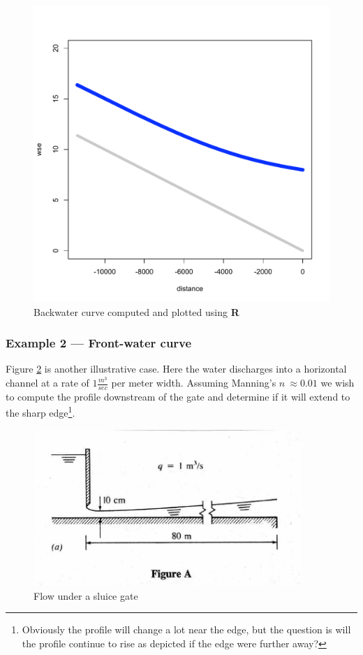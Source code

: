 \begin{figure}[h!] %
   \centering
   \includegraphics[width=5in]{example1Rplot.pdf} 
   \caption{Backwater curve computed and plotted using \textbf{R}}
   \label{fig:Rplot1}
\end{figure}

\subsubsection{Example 2 --- Front-water curve}

Figure \ref{fig:example2} is another illustrative case.  Here the water discharges into a horizontal channel at a rate of $1 \frac{m^3}{sec}$ per meter width.  Assuming Manning's $n~\approx 0.01$ we wish to compute the profile downstream of the gate and determine if it will extend  to the sharp edge\footnote{Obviously the profile will change a lot near the edge, but the question is will the profile continue to rise as depicted if the edge were further away?}.

\begin{figure}[h!] %
   \centering
   \includegraphics[width=4in]{bw_curve2.jpg} 
   \caption{Flow under a sluice gate}
   \label{fig:example2}
\end{figure}

